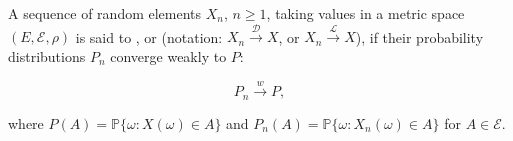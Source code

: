 A sequence of random elements $X_n$, $n \geq 1$, taking values in a metric space $(E, \mathcal{E}, \rho)$ is said to , or  (notation: $X_n \xrightarrow{\mathcal{D}} X$, or $X_n \xrightarrow{\mathcal{L}} X$), if their probability distributions $P_n$ converge weakly to $P$:

$$P_n \xrightarrow{w} P,$$

where $P(A) = \mathbb{P}\{\omega : X(\omega) \in A\}$ and $P_n(A) = \mathbb{P}\{\omega : X_n(\omega) \in A\}$ for $A \in \mathcal{E}$.